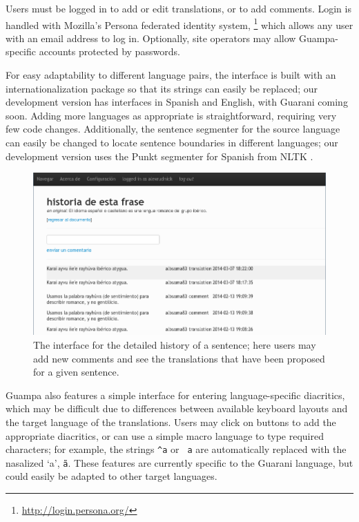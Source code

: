 \documentclass[10pt, a4paper]{article}
\begin{document}
Users must be logged in to add or edit translations, or to add comments.
Login is handled with Mozilla's Persona federated identity system,
\footnote{\url{http://login.persona.org/}}
which allows any user with an email address to log in.
Optionally, site operators may allow Guampa-specific accounts protected by
passwords.

For easy adaptability to different language pairs, the interface is built with
an internationalization package so that its strings can easily be replaced; our
development version has interfaces in Spanish and English, with Guarani coming
soon. Adding more languages as appropriate is straightforward, requiring very
few code changes. Additionally, the sentence segmenter for the source language
can easily be changed to locate sentence boundaries in different languages; our
development version uses the Punkt segmenter for Spanish from NLTK
\cite{nltkbook}.

\begin{figure}
  \begin{center}
\includegraphics[width=12cm]{sentence-history-comment}
  \end{center}
\caption{The interface for the detailed history of a sentence; here users may
add new comments and see the translations that have been proposed for a given
sentence.}
\label{fig:history}
\end{figure}

Guampa also features a simple interface for entering language-specific
diacritics, which may be difficult due to differences between available
keyboard layouts and the target language of the translations. Users may click
on buttons to add the appropriate diacritics, or can use a simple macro
language to type required characters; for example, the strings
\texttt{\string^a} or 
\texttt{\string~a} are automatically replaced with the nasalized `a',
\texttt{\~a}.
These features are currently specific to the Guarani language, but could easily
be adapted to other target languages.
\end{document}

